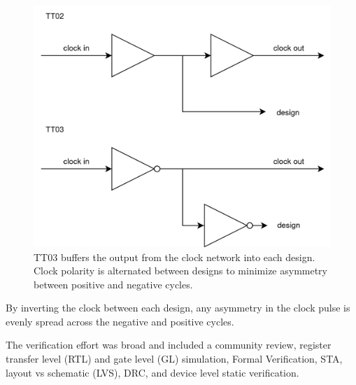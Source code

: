 \begin{figure}[htp]
\centering
\includegraphics[width=\columnwidth]{./Figs/tt02 vs tt03 scanchain clock.png}
\caption{TT03 buffers the output from the clock network into each design. Clock polarity is alternated between designs to minimize asymmetry between positive and negative cycles.}
\label{fig:TT02_vs_TT03}
\end{figure}

By inverting the clock between each design, any asymmetry in the clock pulse is evenly spread across the negative and positive cycles.

The verification effort\cite{verificationmd} was broad and included a community review, register transfer level (RTL) and gate level (GL) simulation, Formal Verification\cite{sby}, STA, layout vs schematic (LVS), DRC, and device level static verification\cite{cvc}.
